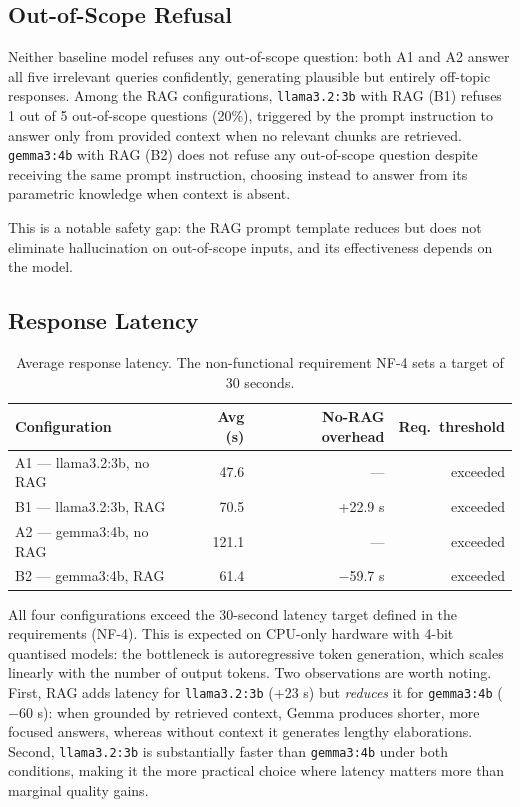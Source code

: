 \subsection{Out-of-Scope Refusal}

Neither baseline model refuses any out-of-scope question: both A1 and A2 answer all five irrelevant queries confidently, generating plausible but entirely off-topic responses. Among the RAG configurations, \texttt{llama3.2:3b} with RAG (B1) refuses 1 out of 5 out-of-scope questions (20\%), triggered by the prompt instruction to answer only from provided context when no relevant chunks are retrieved. \texttt{gemma3:4b} with RAG (B2) does not refuse any out-of-scope question despite receiving the same prompt instruction, choosing instead to answer from its parametric knowledge when context is absent.

This is a notable safety gap: the RAG prompt template reduces but does not eliminate hallucination on out-of-scope inputs, and its effectiveness depends on the model.

\subsection{Response Latency}

\begin{table}[H]
    \centering
    \begin{tabular}{|l|r|r|r|}
        \hline
        \textbf{Configuration} & \textbf{Avg (s)} & \textbf{No-RAG overhead} & \textbf{Req.\ threshold} \\
        \hline\hline
        A1 — llama3.2:3b, no RAG & 47.6  & —       & exceeded \\
        B1 — llama3.2:3b, RAG    & 70.5  & +22.9 s & exceeded \\
        A2 — gemma3:4b,   no RAG & 121.1 & —       & exceeded \\
        B2 — gemma3:4b,   RAG    & 61.4  & $-$59.7 s & exceeded \\
        \hline
    \end{tabular}
    \caption{Average response latency. The non-functional requirement NF-4 sets a target of 30 seconds.}
    \label{tab:eval-latency}
\end{table}

All four configurations exceed the 30-second latency target defined in the requirements (NF-4). This is expected on CPU-only hardware with 4-bit quantised models: the bottleneck is autoregressive token generation, which scales linearly with the number of output tokens. Two observations are worth noting. First, RAG adds latency for \texttt{llama3.2:3b} (+23 s) but \emph{reduces} it for \texttt{gemma3:4b} ($-$60 s): when grounded by retrieved context, Gemma produces shorter, more focused answers, whereas without context it generates lengthy elaborations. Second, \texttt{llama3.2:3b} is substantially faster than \texttt{gemma3:4b} under both conditions, making it the more practical choice where latency matters more than marginal quality gains.

